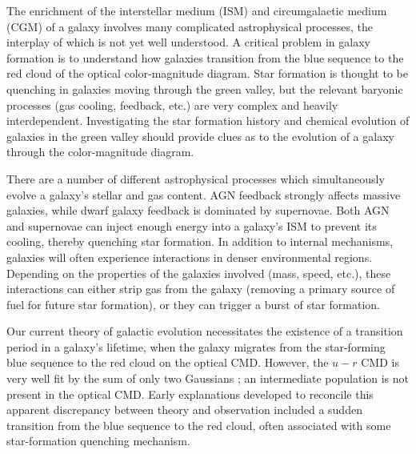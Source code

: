 The enrichment of the interstellar medium (ISM) and circumgalactic medium (CGM) 
of a galaxy involves many complicated astrophysical processes, the interplay of 
which is not yet well understood.  A critical problem in galaxy formation is to 
understand how galaxies transition from the blue sequence to the red cloud of 
the optical color-magnitude diagram.  Star formation is thought to be quenching 
in galaxies moving through the green valley, but the relevant baryonic processes 
(gas cooling, feedback, etc.) are very complex and heavily interdependent.  
Investigating the star formation history and chemical evolution of galaxies in 
the green valley should provide clues as to the evolution of a galaxy through 
the color-magnitude diagram.


There are a number of different astrophysical processes which simultaneously 
evolve a galaxy's stellar and gas content.  AGN feedback strongly affects 
massive galaxies, while dwarf galaxy feedback is dominated by supernovae.  Both 
AGN and supernovae can inject enough energy into a galaxy's ISM to prevent its 
cooling, thereby quenching star formation.  In addition to internal mechanisms, 
galaxies will often experience interactions in denser environmental regions.  
Depending on the properties of the galaxies involved (mass, speed, etc.), these 
interactions can either strip gas from the galaxy (removing a primary source of 
fuel for future star formation), or they can trigger a burst of star formation.

Our current theory of galactic evolution necessitates the existence of a 
transition period in a galaxy's lifetime, when the galaxy migrates from the 
star-forming blue sequence to the red cloud on the optical CMD.  However, the 
$u-r$ CMD is very well fit by the sum of only two Gaussians \citep{Strateva01, 
Baldry04}; an intermediate population is not present in the optical CMD.  Early 
explanations developed to reconcile this apparent discrepancy between theory and 
observation included a sudden transition from the blue sequence to the red 
cloud, often associated with some star-formation quenching mechanism.

